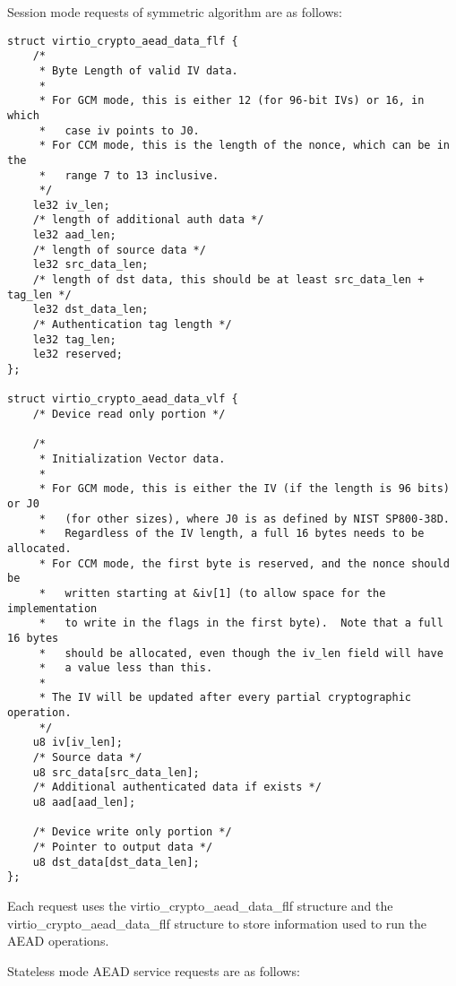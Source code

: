 Session mode requests of symmetric algorithm are as follows:

\begin{lstlisting}
struct virtio_crypto_aead_data_flf {
    /*
     * Byte Length of valid IV data.
     *
     * For GCM mode, this is either 12 (for 96-bit IVs) or 16, in which
     *   case iv points to J0.
     * For CCM mode, this is the length of the nonce, which can be in the
     *   range 7 to 13 inclusive.
     */
    le32 iv_len;
    /* length of additional auth data */
    le32 aad_len;
    /* length of source data */
    le32 src_data_len;
    /* length of dst data, this should be at least src_data_len + tag_len */
    le32 dst_data_len;
    /* Authentication tag length */
    le32 tag_len;
    le32 reserved;
};

struct virtio_crypto_aead_data_vlf {
    /* Device read only portion */

    /*
     * Initialization Vector data.
     *
     * For GCM mode, this is either the IV (if the length is 96 bits) or J0
     *   (for other sizes), where J0 is as defined by NIST SP800-38D.
     *   Regardless of the IV length, a full 16 bytes needs to be allocated.
     * For CCM mode, the first byte is reserved, and the nonce should be
     *   written starting at &iv[1] (to allow space for the implementation
     *   to write in the flags in the first byte).  Note that a full 16 bytes
     *   should be allocated, even though the iv_len field will have
     *   a value less than this.
     *
     * The IV will be updated after every partial cryptographic operation.
     */
    u8 iv[iv_len];
    /* Source data */
    u8 src_data[src_data_len];
    /* Additional authenticated data if exists */
    u8 aad[aad_len];

    /* Device write only portion */
    /* Pointer to output data */
    u8 dst_data[dst_data_len];
};
\end{lstlisting}

Each request uses the virtio_crypto_aead_data_flf structure and the
virtio_crypto_aead_data_flf structure to store information used to run the
AEAD operations.

Stateless mode AEAD service requests are as follows:

